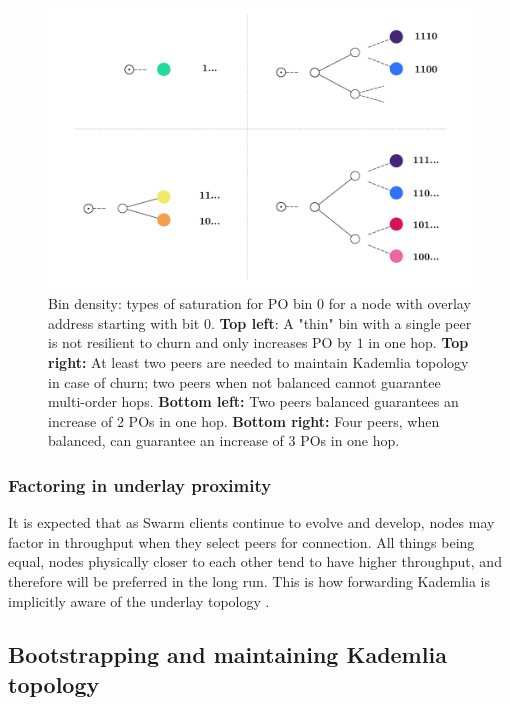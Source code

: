 \begin{figure}[htbp]
   \centering
   \includegraphics[width=\textwidth]{fig/bindensity.pdf}
   \caption[Bin density \statusgreen]{Bin density:  types of saturation for PO bin $0$ for a node with overlay address starting with bit $0$. \textbf{Top left}: A "thin" bin with a single peer is not resilient to churn and only increases PO by $1$ in one hop. \textbf{Top right:} At least two peers are needed to maintain Kademlia topology in case of churn; two peers when not balanced cannot guarantee multi-order hops. \textbf{Bottom left:} Two peers balanced guarantees an increase of 2 POs in one hop. \textbf{Bottom right:} Four peers, when balanced, can guarantee an increase of $3$ POs in one hop.}
   \label{fig:bindensity}
\end{figure}

\subsubsection{Factoring in underlay proximity}
It is expected that as Swarm clients continue to evolve and develop, nodes may factor in throughput when they select peers for connection. All things being equal, nodes physically closer to each other tend to have higher throughput, and therefore will be preferred in the long run. This is how forwarding Kademlia is implicitly aware of the underlay topology \citep{heep2010r}. 


\subsection{Bootstrapping and maintaining Kademlia topology \statusgreen}\label{sec:bootstrapping}
 
